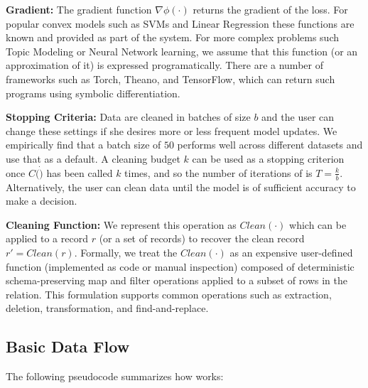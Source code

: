 \vspace{0.25em}

\noindent\textbf{Gradient:} The gradient function $\nabla\phi(\cdot)$ returns the gradient of the loss. 
For popular convex models such as SVMs and Linear Regression these functions are known and provided as part of the system. 
For more complex problems such Topic Modeling or Neural Network learning, we assume that this function (or an approximation of it) is expressed programatically. There are a number of frameworks such as Torch, Theano, and TensorFlow, which can return such programs using symbolic differentiation. 

\vspace{0.25em}

\noindent\textbf{Stopping Criteria: } Data are cleaned in batches of size $b$ and the user can change these settings if she desires more or less frequent model updates.
We empirically find that a batch size of $50$ performs well across different datasets and use that as a default.
A cleaning budget $k$ can be used as a stopping criterion once $C(\dot)$ has been called $k$ times, and so the number of iterations of \sys is $T = \frac{k}{b}$.
Alternatively, the user can clean data until the model is of sufficient accuracy to make a decision.

\vspace{0.25em}

\noindent\textbf{Cleaning Function: } We represent this operation as $Clean(\cdot)$ which can be applied to a record $r$ (or a set of records) to recover the clean record $r' = Clean(r)$.
Formally, we treat the $Clean(\cdot)$ as an expensive user-defined function (implemented as code or  manual inspection) composed of deterministic schema-preserving \textsf{map} and \textsf{filter} operations applied to a subset of rows in the relation. 
This formulation supports common operations such as extraction, deletion, transformation, and find-and-replace.

\subsection{Basic Data Flow} \label{df}
The following pseudocode summarizes how \sys works:

